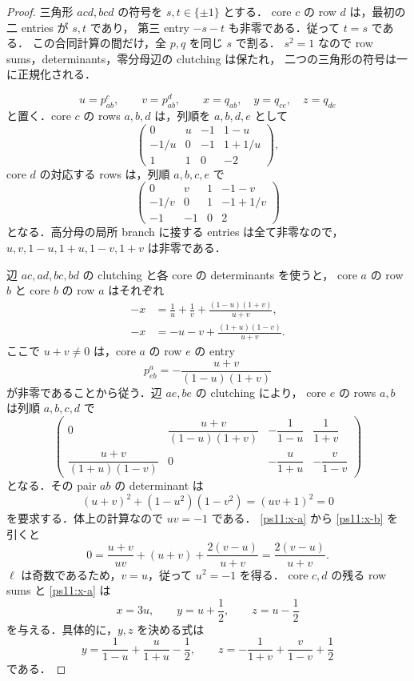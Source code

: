 \begin{proof}
三角形 $acd,bcd$ の符号を $s,t\in\{\pm1\}$ とする．
core $c$ の row $d$ は，最初の二 entries が $s,t$ であり，
第三 entry $-s-t$ も非零である．従って $t=s$ である．
この合同計算の間だけ，全 $p,q$ を同じ $s$ で割る．
$s^2=1$ なので row sums，determinants，零分母辺の clutching は保たれ，
二つの三角形の符号は一に正規化される．

\[
 u=p^c_{ab},\qquad v=p^d_{ab},\qquad
 x=q_{ab},\quad y=q_{ce},\quad z=q_{de}
\]
と置く．core $c$ の rows $a,b,d$ は，列順を $a,b,d,e$ として
\[
 \begin{pmatrix}
 0&u&-1&1-u\\
 -1/u&0&-1&1+1/u\\
 1&1&0&-2
 \end{pmatrix},
\]
core $d$ の対応する rows は，列順 $a,b,c,e$ で
\[
 \begin{pmatrix}
 0&v&1&-1-v\\
 -1/v&0&1&-1+1/v\\
 -1&-1&0&2
 \end{pmatrix}
\]
となる．高分母の局所 branch に接する entries は全て非零なので，
$u,v,1-u,1+u,1-v,1+v$ は非零である．

辺 $ac,ad,bc,bd$ の clutching と各 core の determinants を使うと，
core $a$ の row $b$ と core $b$ の row $a$ はそれぞれ
\begin{align}
 -x&=\frac1u+\frac1v+
       \frac{(1-u)(1+v)}{u+v},\label{ps11:x-a}\\
 -x&=-u-v+\frac{(1+u)(1-v)}{u+v}.
       \label{ps11:x-b}
\end{align}
ここで $u+v\ne0$ は，core $a$ の row $e$ の entry
\[
 p^a_{eb}=-\frac{u+v}{(1-u)(1+v)}
\]
が非零であることから従う．辺 $ae,be$ の clutching により，
core $e$ の rows $a,b$ は列順 $a,b,c,d$ で
\begin{equation}\label{ps11:e-high-rows}
 \begin{pmatrix}
 0&\dfrac{u+v}{(1-u)(1+v)}&-\dfrac1{1-u}&\dfrac1{1+v}\\[6pt]
 \dfrac{u+v}{(1+u)(1-v)}&0&-\dfrac u{1+u}&-\dfrac v{1-v}
 \end{pmatrix}
\end{equation}
となる．その pair $ab$ の determinant は
\[
 (u+v)^2+(1-u^2)(1-v^2)=(uv+1)^2=0
\]
を要求する．体上の計算なので $uv=-1$ である．
\eqref{ps11:x-a} から \eqref{ps11:x-b} を引くと
\[
 0=\frac{u+v}{uv}+(u+v)+\frac{2(v-u)}{u+v}
   =\frac{2(v-u)}{u+v}.
\]
$\ell$ は奇数であるため，$v=u$，従って $u^2=-1$ を得る．
core $c,d$ の残る row sums と \eqref{ps11:x-a} は
\begin{equation}\label{ps11:xyz}
 x=3u,\qquad y=u+\frac12,\qquad z=u-\frac12
\end{equation}
を与える．具体的に，$y,z$ を決める式は
\[
 y=\frac1{1-u}+\frac u{1+u}-\frac12,
 \qquad
 z=-\frac1{1+v}+\frac v{1-v}+\frac12
\]
である．


\end{proof}

